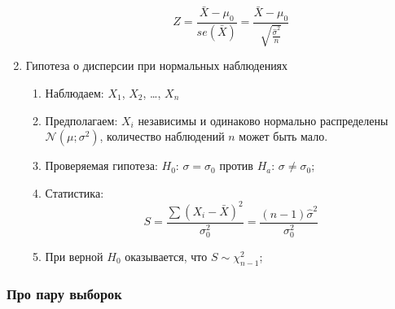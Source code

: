 \documentclass[12pt, a4paper]{article}
\def \cN{\mathcal{N}}
\begin{document}
\begin{enumerate}
\begin{enumerate}
	\[
	  Z = \frac{\bar X - \mu_0}{se(\bar X)} = \frac{\bar X - \mu_0}{\sqrt{\frac{\hat \sigma^2}{n}}}
	\]


  \end{enumerate}


  \item Гипотеза о дисперсии при нормальных наблюдениях
    \begin{enumerate}

      \item Наблюдаем: $X_1$, $X_2$, \ldots, $X_n$

      \item Предполагаем: $X_i$ независимы и одинаково нормально распределены $\cN(\mu; \sigma^2)$, количество наблюдений $n$ может быть мало.

      \item Проверяемая гипотеза: $H_0$: $\sigma = \sigma_0$ против $H_a$: $\sigma \neq \sigma_0$;

      \item Статистика:
	\[
	  S = \frac{\sum (X_i - \bar X)^2}{\sigma_0^2} = \frac{(n-1)\hat\sigma^2}{\sigma_0^2}
      \]

    \item При верной $H_0$ оказывается, что $S \sim \chi^2_{n-1}$;


    \end{enumerate}

\end{enumerate}


\subsubsection{Про пару выборок}
\end{document}
